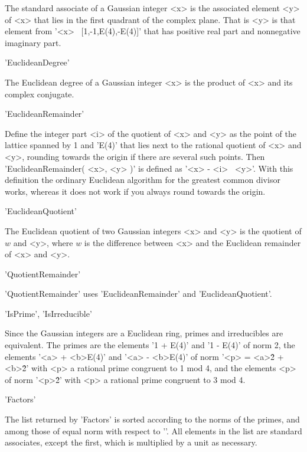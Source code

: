 The standard associate  of  a  Gaussian  integer  <x> is the   associated
element <y> of <x> that lies in the first  quadrant of the complex plane.
That  is <y>  is  that element  from '<x> \*\ [1,-1,E(4),-E(4)]' that has
positive real part and nonnegative imaginary part.

\vspace{5mm}
'EuclideanDegree'

The Euclidean degree of a Gaussian  integer <x> is the product of <x> and
its complex conjugate.

\vspace{5mm}
'EuclideanRemainder'

Define the integer part <i> of the quotient of  <x>  and <y> as the point
of  the lattice spanned by 1  and 'E(4)' that  lies next to the  rational
quotient of <x> and <y>, rounding towards the origin if there are several
such  points.  Then 'EuclideanRemainder( <x>, <y> )' is defined as '<x> -
<i> \*\ <y>'.  With this definition the ordinary Euclidean algorithm  for
the greatest common divisor works, whereas it does not work if you always
round towards the origin.

\vspace{5mm}
'EuclideanQuotient'

The  Euclidean quotient of two  Gaussian integers  <x>  and  <y>  is  the
quotient of $w$ and <y>, where $w$  is the difference between <x> and the
Euclidean remainder of <x> and <y>.

\vspace{5mm}
'QuotientRemainder'

'QuotientRemainder' uses 'EuclideanRemainder' and 'EuclideanQuotient'.

\vspace{5mm}
'IsPrime', 'IsIrreducible'

Since the Gaussian integers are a Euclidean ring, primes and irreducibles
are equivalent.  The primes are the elements '1 + E(4)' and '1 - E(4)' of
norm 2, the elements  '<a> + <b>\*E(4)'  and  '<a> - <b>\*E(4)'  of  norm
'<p> = <a>\^2 + <b>\^2' with <p> a  rational prime congruent  to 1 mod 4,
and the elements <p> of norm '<p>\^2' with <p> a rational prime congruent
to 3 mod 4.

\vspace{5mm}
'Factors'

The list returned by 'Factors'  is sorted according to  the norms of  the
primes, and among those of equal norm with respect to '\<'.  All elements
in  the  list  are  standard  associates,  except  the  first,  which  is
multiplied by a unit as necessary.


